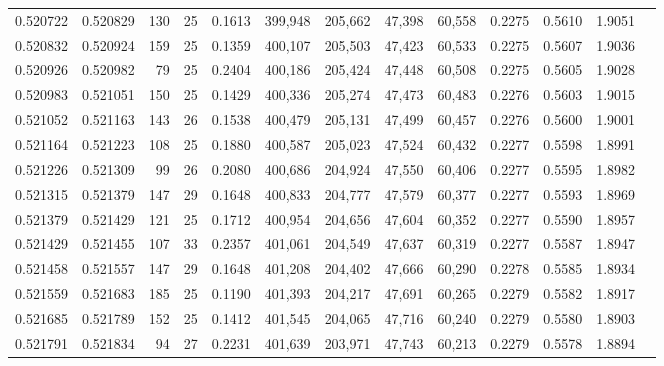 \begin{tabular}{rrrrrrrrrrrrr}
0.520722 & 0.520829 & 130 &  25 &                                     0.1613 & 399,948 & 205,662 &  47,398 &  60,558 & 0.2275 & 0.5610 & 1.9051 \\
0.520832 & 0.520924 & 159 &  25 &                                     0.1359 & 400,107 & 205,503 &  47,423 &  60,533 & 0.2275 & 0.5607 & 1.9036 \\
0.520926 & 0.520982 &  79 &  25 &                                     0.2404 & 400,186 & 205,424 &  47,448 &  60,508 & 0.2275 & 0.5605 & 1.9028 \\
0.520983 & 0.521051 & 150 &  25 &                                     0.1429 & 400,336 & 205,274 &  47,473 &  60,483 & 0.2276 & 0.5603 & 1.9015 \\
0.521052 & 0.521163 & 143 &  26 &                                     0.1538 & 400,479 & 205,131 &  47,499 &  60,457 & 0.2276 & 0.5600 & 1.9001 \\
0.521164 & 0.521223 & 108 &  25 &                                     0.1880 & 400,587 & 205,023 &  47,524 &  60,432 & 0.2277 & 0.5598 & 1.8991 \\
0.521226 & 0.521309 &  99 &  26 &                                     0.2080 & 400,686 & 204,924 &  47,550 &  60,406 & 0.2277 & 0.5595 & 1.8982 \\
0.521315 & 0.521379 & 147 &  29 &                                     0.1648 & 400,833 & 204,777 &  47,579 &  60,377 & 0.2277 & 0.5593 & 1.8969 \\
0.521379 & 0.521429 & 121 &  25 &                                     0.1712 & 400,954 & 204,656 &  47,604 &  60,352 & 0.2277 & 0.5590 & 1.8957 \\
0.521429 & 0.521455 & 107 &  33 &                                     0.2357 & 401,061 & 204,549 &  47,637 &  60,319 & 0.2277 & 0.5587 & 1.8947 \\
0.521458 & 0.521557 & 147 &  29 &                                     0.1648 & 401,208 & 204,402 &  47,666 &  60,290 & 0.2278 & 0.5585 & 1.8934 \\
0.521559 & 0.521683 & 185 &  25 &                                     0.1190 & 401,393 & 204,217 &  47,691 &  60,265 & 0.2279 & 0.5582 & 1.8917 \\
0.521685 & 0.521789 & 152 &  25 &                                     0.1412 & 401,545 & 204,065 &  47,716 &  60,240 & 0.2279 & 0.5580 & 1.8903 \\
0.521791 & 0.521834 &  94 &  27 &                                     0.2231 & 401,639 & 203,971 &  47,743 &  60,213 & 0.2279 & 0.5578 & 1.8894 \\

\end{tabular}
